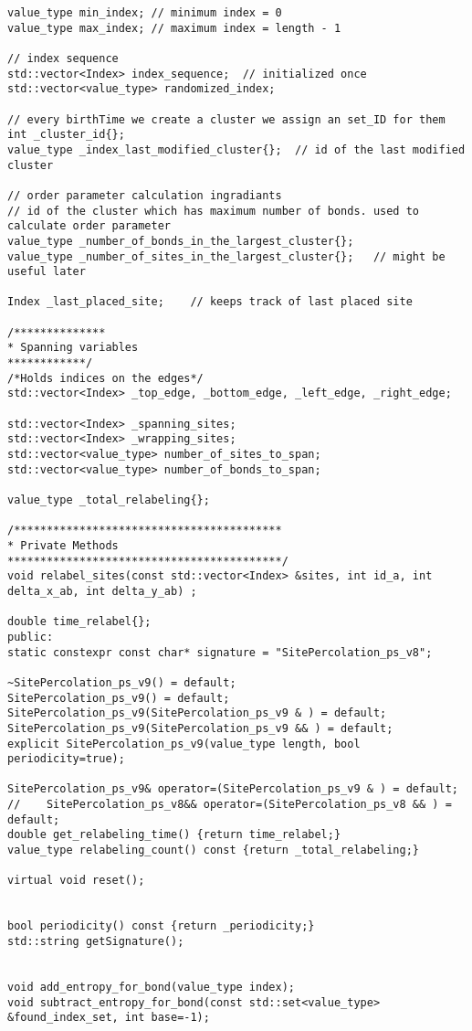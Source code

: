 \begin{lstlisting}[style=CStyle]
value_type min_index; // minimum index = 0
value_type max_index; // maximum index = length - 1

// index sequence
std::vector<Index> index_sequence;  // initialized once
std::vector<value_type> randomized_index;

// every birthTime we create a cluster we assign an set_ID for them
int _cluster_id{};
value_type _index_last_modified_cluster{};  // id of the last modified cluster

// order parameter calculation ingradiants
// id of the cluster which has maximum number of bonds. used to calculate order parameter
value_type _number_of_bonds_in_the_largest_cluster{};
value_type _number_of_sites_in_the_largest_cluster{};   // might be useful later

Index _last_placed_site;    // keeps track of last placed site

/**************
* Spanning variables
************/
/*Holds indices on the edges*/
std::vector<Index> _top_edge, _bottom_edge, _left_edge, _right_edge;

std::vector<Index> _spanning_sites;
std::vector<Index> _wrapping_sites;
std::vector<value_type> number_of_sites_to_span;
std::vector<value_type> number_of_bonds_to_span;

value_type _total_relabeling{};

/*****************************************
* Private Methods
******************************************/
void relabel_sites(const std::vector<Index> &sites, int id_a, int delta_x_ab, int delta_y_ab) ;

double time_relabel{};
public:
static constexpr const char* signature = "SitePercolation_ps_v8";

~SitePercolation_ps_v9() = default;
SitePercolation_ps_v9() = default;
SitePercolation_ps_v9(SitePercolation_ps_v9 & ) = default;
SitePercolation_ps_v9(SitePercolation_ps_v9 && ) = default;
explicit SitePercolation_ps_v9(value_type length, bool periodicity=true);

SitePercolation_ps_v9& operator=(SitePercolation_ps_v9 & ) = default;
//    SitePercolation_ps_v8&& operator=(SitePercolation_ps_v8 && ) = default;
double get_relabeling_time() {return time_relabel;}
value_type relabeling_count() const {return _total_relabeling;}

virtual void reset();


bool periodicity() const {return _periodicity;}
std::string getSignature();


void add_entropy_for_bond(value_type index);
void subtract_entropy_for_bond(const std::set<value_type> &found_index_set, int base=-1);


\end{lstlisting}
